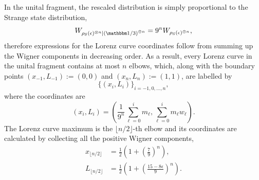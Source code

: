 \documentclass[pra,
aps,
twocolumn,
superscriptaddress,
groupedaddress,
nofootinbib,
reprint
]{revtex4-1}
\begin{document}
In the unital fragment, the rescaled distribution is simply proportional to the Strange state distribution,
\begin{equation}
	W_{\rho_{\rm{S}}(\epsilon)^{\otimes n}|\left(\id/3\right)^{\otimes n}} = 9^n W_{\rho_{\rm{S}}(\epsilon)^{\otimes n}},
\end{equation}
therefore expressions for the Lorenz curve coordinates follow from summing up the Wigner components in decreasing order.
As a result, every Lorenz curve in the unital fragment contains at most $n$ elbows, which, along with the boundary points $(x_{-1}, L_{-1}) := (0,0)$ and $(x_{n}, L_{n}) := (1,1)$, are labelled by 
\begin{equation*}
\{(x_{i}, L_{i})\}_{i=-1,0,\dots,n},
\end{equation*}
where the coordinates are
\begin{equation}
	(x_{i}, L_{i}) = \left( \frac{1}{9^n}\sum_{\ell=0}^i m_{\ell}, \sum_{\ell=0}^i m_{\ell} w_{\ell} \right).
\end{equation}
The Lorenz curve maximum is the $\lfloor n/2 \rfloor$-th elbow and its coordinates are calculated by collecting all the positive Wigner components,
\begin{align}
	x_{\lfloor n/2 \rfloor} &= \frac{1}{2}\left(1 + \left(\frac{7}{9}\right)^n\right), \\
	L_{\lfloor n/2 \rfloor} &= \frac{1}{2}\left (1 + \left(\frac{15 - 8\epsilon}{9}\right)^n \right).
\end{align}
\end{document}
